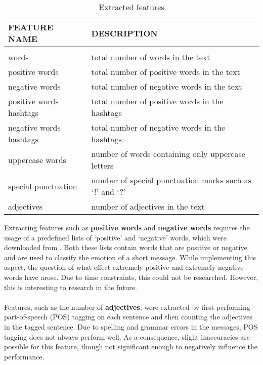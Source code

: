 \documentclass{article} %
\newcommand{\red}[1]{\textit{\color{red}{#1}}}
\begin{document}
\begin{table}[h!]
\caption{Extracted features}
\label{featuretable}
\begin{center}
\begin{tabular}{ll}
\multicolumn{1}{l}{\bf FEATURE NAME}  &\multicolumn{1}{l}{\bf DESCRIPTION}
\\ \hline \\
words & total number of words in the text \\
positive words & total number of positive words in the text \\
negative words & total number of negative words in the text \\
positive words hashtags & total number of positive words in the hashtags \\
negative words hashtags & total number of negative words in the hashtags \\
uppercase words & number of words containing only uppercase letters \\
special punctuation & number of special punctuation marks such as `!' and `?' \\
adjectives & number of adjectives in the text 
\end{tabular}{}
\end{center}
\end{table}



\noindent Extracting features such as \textbf{positive words} and \textbf{negative words} requires the usage of a predefined lists of `positive' and `negative' words, which were downloaded from \red{REFERENCE}. Both these lists contain words that are positive or negative and are used to classify the emotion of a short message. While implementing this aspect, the question of what effect extremely positive and extremely negative words have arose. Due to time constraints, this could not be researched. However, this is interesting to research in the future. %
\\
\\
Features, such as the number of \textbf{adjectives}, were extracted by first performing part-of-speech (POS) tagging on each sentence and then counting the adjectives in the tagged sentence. Due to spelling and grammar errors in the messages, POS tagging does not always perform  well. As a consequence, slight inaccuracies are possible for this feature, though not significant enough to negatively influence the performance. %
\end{document}
